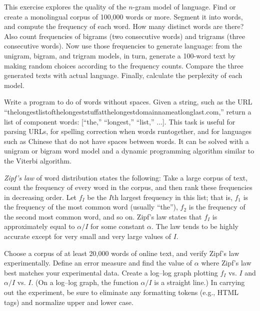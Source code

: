 
\begin{uexercise}\prgex
This exercise explores the quality of the \(n\)-gram model of language.
Find or create a monolingual corpus of 100,000 words or more. Segment it
into words, and compute the frequency of each word. How many distinct
words are there?  Also count frequencies of
bigrams (two consecutive words) and trigrams (three consecutive
words).  Now use those frequencies to generate language: from the
unigram, bigram, and trigram models, in turn, generate a 100-word text
by making random choices according to the frequency counts.  Compare
the three generated texts with actual language. Finally, calculate the
perplexity of each model.
\end{uexercise} 

\begin{exercise}\prgex
  Write a program to do  of words without spaces.
Given a string, such as the URL
``thelongestlistofthelongeststuffatthelongestdomainnameatlonglast.com,''
return a list of component words: [``the,'' ``longest,'' ``list,''
\(\ldots\)]. This task is useful for parsing URLs, for spelling correction when words runtogether,
and for languages such as Chinese that do not have spaces between words. It can be solved
with a unigram or bigram word model and a dynamic programming algorithm similar to the Viterbi algorithm.
\end{exercise} 

\begin{iexercise}\prgex
  {\em Zipf's law} of word distribution states the following: Take a large corpus
of text, count the frequency of every word in the corpus, and then rank these
frequencies in decreasing order. Let $f_{I}$ be the $I$th largest frequency in
this list; that is, $f_{1}$ is the frequency of the most common word (usually
``the''), $f_{2}$ is the frequency of the second most common word, and so on.
Zipf's law states that $f_{I}$ is approximately equal to $\alpha / I$ for
some constant $\alpha$.  The law tends to be highly accurate except for 
very small and very large values of $I$.

Choose a corpus of at least 20,000 words of online text, and verify 
Zipf's law experimentally. Define an error measure and find the value of
$\alpha$ where Zipf's law best matches your experimental data. Create
a log--log graph plotting $f_{I}$ vs. $I$ and $\alpha/I$ vs. $I$. (On
a log--log graph, the function $\alpha/I$ is a straight line.)
In carrying out the experiment, be sure to eliminate any formatting tokens
(e.g., HTML tags) and normalize upper and lower case. 
\end{iexercise} 


